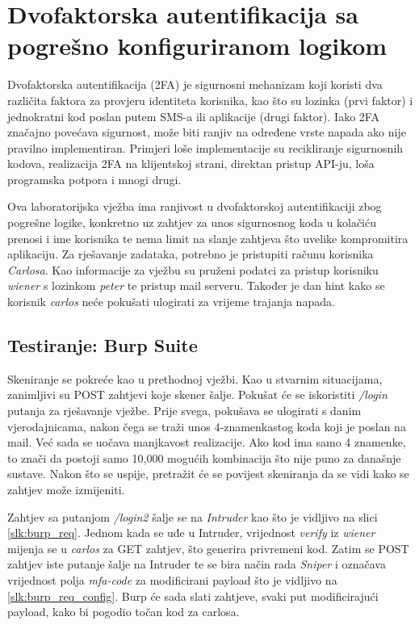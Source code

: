 \section{Dvofaktorska autentifikacija sa pogrešno konfiguriranom logikom}
Dvofaktorska autentifikacija (2FA) je sigurnosni mehanizam koji koristi dva različita faktora za provjeru identiteta korisnika, kao što 
su lozinka (prvi faktor) i jednokratni kod poslan putem SMS-a ili aplikacije (drugi faktor). Iako 2FA značajno povećava sigurnost, može 
biti ranjiv na određene vrste napada ako nije pravilno implementiran.\cite{dmitrienko2014security,aloul2009two}
Primjeri loše implementacije su recikliranje sigurnosnih kodova, realizacija 2FA na klijentskoj strani, direktan pristup API-ju, loša programska potpora i mnogi drugi.

Ova laboratorijska vježba ima ranjivost u dvofaktorskoj autentifikaciji zbog pogrešne logike, konkretno uz zahtjev za unos sigurnosnog koda u kolačiću prenosi i ime korisnika te nema limit na slanje zahtjeva što uvelike kompromitira aplikaciju.
Za rješavanje zadataka, potrebno je pristupiti računu korisnika \textit{Carlosa}.
Kao informacije za vježbu su pruženi podatci za pristup korisniku \textit{wiener} s lozinkom \textit{peter} te pristup mail serveru.\cite{2FA_lab}
Također je dan hint kako se korisnik \textit{carlos} neće pokušati ulogirati za vrijeme trajanja napada.

\subsection{Testiranje: Burp Suite}
Skeniranje se pokreće kao u prethodnoj vježbi. 
Kao u stvarnim situacijama, zanimljivi su POST zahtjevi koje skener šalje. 
Pokušat će se iskoristiti \textit{/login} putanja za rješavanje vježbe. 
Prije svega, pokušava se ulogirati s danim vjerodajnicama, nakon čega se traži unos 4-znamenkastog koda koji je poslan na mail. 
Već sada se uočava manjkavost realizacije. 
Ako kod ima samo 4 znamenke, to znači da postoji samo 10,000 mogućih kombinacija što nije puno za današnje sustave. 
Nakon što se uspije, pretražit će se povijest skeniranja da se vidi kako se zahtjev može izmijeniti.

Zahtjev sa putanjom \textit{/login2} šalje se na \textit{Intruder} kao što je vidljivo na slici \ref{slk:burp_req}. 
Jednom kada se uđe u Intruder, vrijednost \textit{verify} iz \textit{wiener} mijenja se u \textit{carlos} za GET zahtjev, što generira privremeni kod. 
Zatim se POST zahtjev iste putanje šalje na Intruder te se bira način rada \textit{Sniper} i označava vrijednost polja \textit{mfa-code} za modificirani payload što je vidljivo na \ref{slk:burp_req_config}. 
Burp će sada slati zahtjeve, svaki put modificirajući payload, kako bi pogodio točan kod za carlosa.


